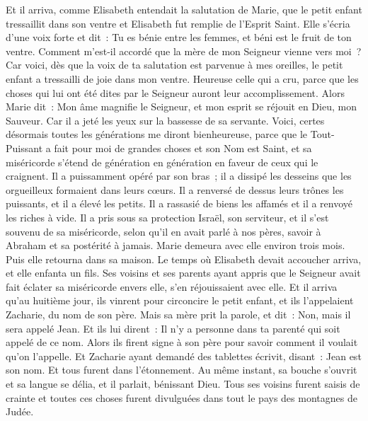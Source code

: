 \begin{multicols}{2}
Et il arriva, comme Elisabeth entendait la salutation de Marie, que le petit enfant tressaillit dans son ventre et Elisabeth fut remplie de l'Esprit Saint.
Elle s'écria d'une voix forte et dit~: Tu es bénie entre les femmes, et béni est le fruit de ton ventre.
Comment m'est-il accordé que la mère de mon Seigneur vienne vers moi~?
Car voici, dès que la voix de ta salutation est parvenue à mes oreilles, le petit enfant a tressailli de joie dans mon ventre.
Heureuse celle qui a cru, parce que les choses qui lui ont été dites par le Seigneur auront leur accomplissement.
Alors Marie dit~: Mon âme magnifie le Seigneur,
et mon esprit se réjouit en Dieu, mon Sauveur.
Car il a jeté les yeux sur la bassesse de sa servante. Voici, certes désormais toutes les générations me diront bienheureuse,
parce que le Tout-Puissant a fait pour moi de grandes choses et son Nom est Saint,
et sa miséricorde s'étend de génération en génération en faveur de ceux qui le craignent.
Il a puissamment opéré par son bras~; il a dissipé les desseins que les orgueilleux formaient dans leurs cœurs.
Il a renversé de dessus leurs trônes les puissants, et il a élevé les petits.
Il a rassasié de biens les affamés et il a renvoyé les riches à vide.
Il a pris sous sa protection Israël, son serviteur, et il s'est souvenu de sa miséricorde,
selon qu'il en avait parlé à nos pères, savoir à Abraham et sa postérité à jamais.
Marie demeura avec elle environ trois mois. Puis elle retourna dans sa maison.
Le temps où Elisabeth devait accoucher arriva, et elle enfanta un fils.
Ses voisins et ses parents ayant appris que le Seigneur avait fait éclater sa miséricorde envers elle, s'en réjouissaient avec elle.
Et il arriva qu'au huitième jour, ils vinrent pour circoncire le petit enfant, et ils l'appelaient Zacharie, du nom de son père.
Mais sa mère prit la parole, et dit~: Non, mais il sera appelé Jean.
Et ils lui dirent~: Il n'y a personne dans ta parenté qui soit appelé de ce nom.
Alors ils firent signe à son père pour savoir comment il voulait qu'on l'appelle.
Et Zacharie ayant demandé des tablettes écrivit, disant~: Jean est son nom. Et tous furent dans l'étonnement.
Au même instant, sa bouche s'ouvrit et sa langue se délia, et il parlait, bénissant Dieu.
Tous ses voisins furent saisis de crainte et toutes ces choses furent divulguées dans tout le pays des montagnes de Judée.

\end{multicols}
